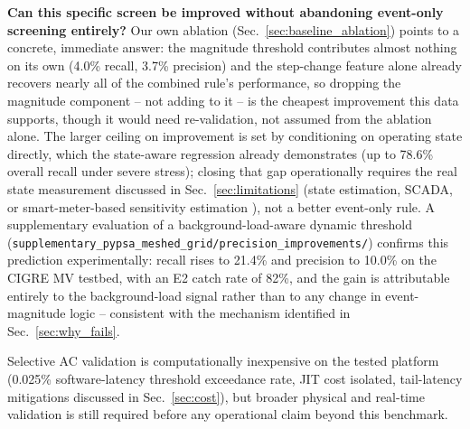 \documentclass[11pt,conference]{IEEEtran}
\begin{document}
\textbf{Can this specific screen be improved without abandoning event-only screening entirely?}
Our own ablation (Sec.~\ref{sec:baseline_ablation}) points to a concrete, immediate answer: the
magnitude threshold contributes almost nothing on its own (4.0\% recall, 3.7\% precision) and the
step-change feature alone already recovers nearly all of the combined rule's performance, so
dropping the magnitude component -- not adding to it -- is the cheapest improvement this data
supports, though it would need re-validation, not assumed from the ablation alone. The larger
ceiling on improvement is set by conditioning on operating state directly, which the state-aware
regression already demonstrates (up to 78.6\% overall recall under severe stress); closing that
gap operationally requires the real state measurement discussed in Sec.~\ref{sec:limitations}
(state estimation, SCADA, or smart-meter-based sensitivity estimation \cite{ref:valverde2018}), not
a better event-only rule. A supplementary evaluation of a background-load-aware dynamic threshold
(\texttt{supplementary\_pypsa\_meshed\_grid/precision\_improvements/}) confirms this prediction
experimentally: recall rises to 21.4\% and precision to 10.0\% on the CIGRE MV testbed,
with an E2 catch rate of 82\%, and the gain is attributable entirely to the background-load signal
rather than to any change in event-magnitude logic -- consistent with the mechanism identified in
Sec.~\ref{sec:why_fails}.

Selective AC validation is computationally inexpensive on the tested platform (0.025\%
software-latency threshold exceedance rate, JIT cost isolated, tail-latency mitigations discussed in
Sec.~\ref{sec:cost}), but broader physical and real-time validation is still required before any
operational claim beyond this benchmark.

{\footnotesize


}
\end{document}
